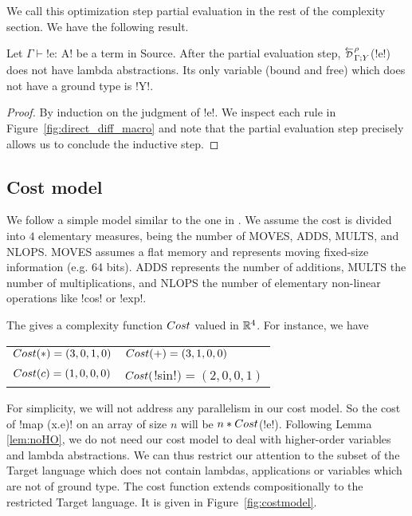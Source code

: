 We call this optimization step partial evaluation in the rest of the complexity section. 
We have the following result.

\begin{lemma}
    \label{lem:noHO}
    Let $\Gamma \vdash$!e: A! be a term in Source. 
    After the partial evaluation step, $\directD{\rho}{\Gamma}{Y}$(!e!) does not have lambda abstractions.
    Its only variable (bound and free) which does not have a ground type is !Y!.
\end{lemma}

\begin{proof}
    By induction on the judgment of !e!. 
    We inspect each rule in Figure~\ref{fig:direct_diff_macro} 
    and note that the partial evaluation step precisely allows us to conclude the inductive step.
\end{proof}

\subsection{Cost model}
\label{sub:costModel}

We follow a simple model similar to the one in \cite{griewank2008evaluating}.
We assume the cost is divided into $4$ elementary measures, being the number of MOVES, ADDS, MULTS, and NLOPS.
MOVES assumes a flat memory and represents moving fixed-size information (e.g. 64 bits). 
ADDS represents the number of additions, 
MULTS the number of multiplications, 
and NLOPS the number of elementary non-linear operations like !cos! or !exp!.

The gives a complexity function $Cost$ valued in $\mathbb{R}^4$. 
For instance, we have 

\begin{tabular}{ll}
    $Cost(*)=(3,0,1,0)$ & $Cost(+)=(3,1,0,0)$\\
    $Cost(c)=(1,0,0,0)$ & $Cost($!sin!$)=(2,0,0,1)$
\end{tabular}

For simplicity, we will not address any parallelism in our cost model. 
So the cost of !map (x.e)! on an array of size $n$ will be $n*Cost$(!e!).
Following Lemma \ref{lem:noHO}, we do not need our cost model to deal with higher-order variables and lambda abstractions.
We can thus restrict our attention to the subset of the Target language which does not contain lambdas, applications or variables which are not of ground type.
The cost function extends compositionally to the restricted Target language. 
It is given in Figure~\ref{fig:costmodel}.

